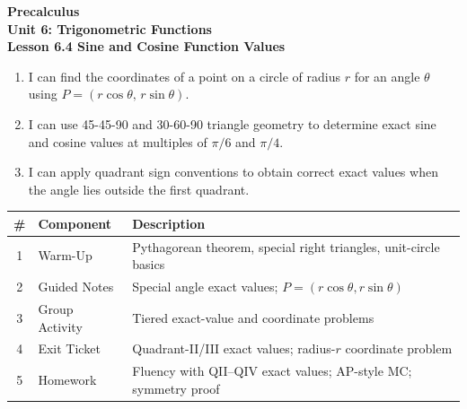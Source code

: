 \documentclass[10pt]{article}
\begin{document}
\vspace{-0.8in}

\begin{center}
  {\color{white}\textbf{\LARGE Precalculus}}\\[4pt]
  {\color{skymid}\large\textbf{Unit 6: Trigonometric Functions}}\\[6pt]
  {\color{white}\textbf{\large Lesson 6.4 \quad Sine and Cosine Function Values}}
\end{center}

\vspace{0.22in}
\namedateperiod
\vspace{0.18in}

\begin{learningtargetbox}
\small
\begin{enumerate}[leftmargin=1.5em, itemsep=5pt]
  \item I can find the coordinates of a point on a circle of radius $r$ for an angle $\theta$ using $P = (r\cos\theta,\, r\sin\theta)$.
  \item I can use 45-45-90 and 30-60-90 triangle geometry to determine exact sine and cosine values at multiples of $\pi/6$ and $\pi/4$.
  \item I can apply quadrant sign conventions to obtain correct exact values when the angle lies outside the first quadrant.
\end{enumerate}
\end{learningtargetbox}

\vspace{0.14in}

\begin{tocbox}
\small
\renewcommand{\arraystretch}{1.5}
\begin{tabularx}{\linewidth}{@{} c l X @{}}
\rowcolor{sky}
\textbf{\#} & \textbf{Component} & \textbf{Description} \\
\midrule
1 & Warm-Up        & Pythagorean theorem, special right triangles, unit-circle basics \\
2 & Guided Notes   & Special angle exact values; $P=(r\cos\theta, r\sin\theta)$ \\
3 & Group Activity & Tiered exact-value and coordinate problems \\
4 & Exit Ticket    & Quadrant-II/III exact values; radius-$r$ coordinate problem \\
5 & Homework       & Fluency with QII--QIV exact values; AP-style MC; symmetry proof \\
\end{tabularx}
\end{tocbox}
\end{document}
